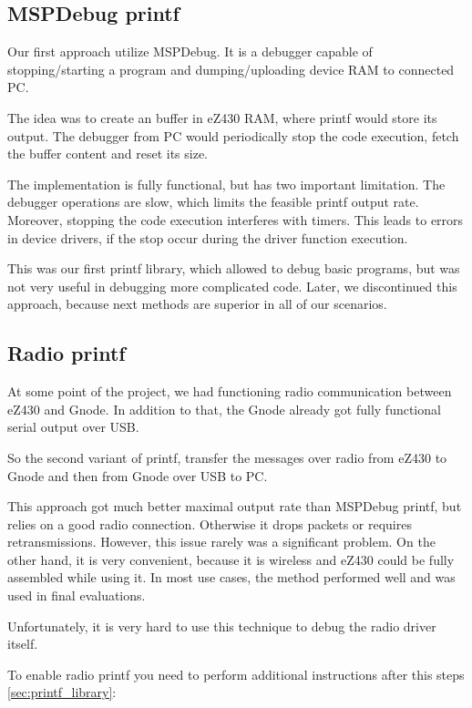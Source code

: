 \subsection{MSPDebug printf}
\label{ch:mspd_printf}

Our first approach utilize MSPDebug.
It is a debugger capable of stopping/starting a program and dumping/uploading device RAM to connected PC.

The idea was to create an buffer in eZ430 RAM, where printf would store its output.
The debugger from PC would periodically stop the code execution, fetch the buffer content and reset its size.

The implementation is fully functional, but has two important limitation.
The debugger operations are slow, which limits the feasible printf output rate.
Moreover, stopping the code execution interferes with timers.
This leads to errors in device drivers, if the stop occur during the driver function execution.

This was our first printf library, which allowed to debug basic programs, but was not very useful in debugging more complicated code.
Later, we discontinued this approach, because next methods are superior in all of our scenarios.

\subsection{Radio printf}
\label{ch:radio_printf}


At some point of the project, we had functioning radio communication between eZ430 and Gnode.
In addition to that, the Gnode already got fully functional serial output over USB. 

So the second variant of printf, transfer the messages over radio from eZ430 to Gnode and then from Gnode over USB to PC.

This approach got much better maximal output rate than MSPDebug printf, but relies on a good radio connection.
Otherwise it drops packets or requires retransmissions.
However, this issue rarely was a significant problem.
On the other hand, it is very convenient, because it is wireless and eZ430 could be fully assembled while using it.
In most use cases, the method performed well and was used in final evaluations.

Unfortunately, it is very hard to use this technique to debug the radio driver itself.

To enable radio printf you need to perform additional
instructions after this steps \ref{sec:printf_library}:

